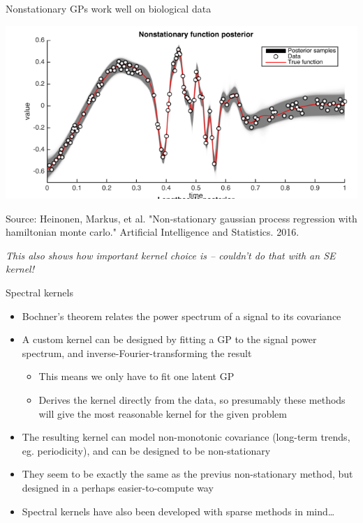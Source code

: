 \documentclass[presentation]{beamer}
\begin{document}
\begin{frame}[plain,label={sec:orgcc737d5}]{Nonstationary GPs work well on biological data}
\begin{center}
\includegraphics[width=.9\linewidth]{./nonstationary.png}
\end{center}

Source: Heinonen, Markus, et al. "Non-stationary gaussian process regression with hamiltonian monte carlo." Artificial Intelligence and Statistics. 2016.

\vfill

\emph{This also shows how important kernel choice is -- couldn't do that with an SE kernel!}
\end{frame}

\begin{frame}[label={sec:org588a13d}]{Spectral kernels}
\begin{itemize}
\item Bochner's theorem relates the power spectrum of a signal to its covariance
\item A custom kernel can be designed by fitting a GP to the signal power spectrum, and inverse-Fourier-transforming the result
\begin{itemize}
\item This means we only have to fit one latent GP
\item Derives the kernel directly from the data, so presumably these methods will give the most reasonable kernel for the given problem
\end{itemize}
\item The resulting kernel can model non-monotonic covariance (long-term trends, eg. periodicity), and can be designed to be non-stationary
\item They seem to be exactly the same as the previus non-stationary method, but designed in a perhaps easier-to-compute way
\end{itemize}

\vfill

\begin{itemize}
\item Spectral kernels have also been developed with sparse methods in mind\ldots{}
\end{itemize}
\end{frame}
\end{document}
